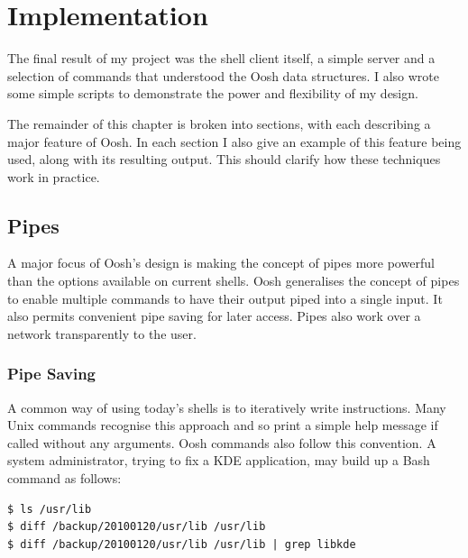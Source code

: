 \documentclass[12pt,twoside,notitlepage]{report}
\begin{document}


\cleardoublepage

\chapter{Implementation}
The final result of my project was the shell client itself, a simple server and
a selection of commands that understood the Oosh data structures. I also wrote
some simple scripts to demonstrate the power and flexibility of my design.

The remainder of this chapter is broken into sections, with each
describing a major feature of Oosh. In each section I also give an example
of this feature being used, along with its resulting output. This
should clarify how these techniques work in practice.

\section{Pipes}
A major focus of Oosh's design is making the concept of pipes more powerful than
the options available on current shells. Oosh generalises the concept of pipes
to enable multiple commands to have their output piped into a single input. It
also permits convenient pipe saving for later access. Pipes also work over a
network transparently to the user.

\subsection{Pipe Saving}
A common way of using today's shells is to iteratively write
instructions. Many Unix commands recognise this approach and so print
a simple help message if called without any arguments. Oosh commands
also follow this convention. A system
administrator, trying to fix a KDE application, may build up a Bash
command as follows:

\begin{verbatim}
$ ls /usr/lib
$ diff /backup/20100120/usr/lib /usr/lib
$ diff /backup/20100120/usr/lib /usr/lib | grep libkde
\end{verbatim}
\end{document}

